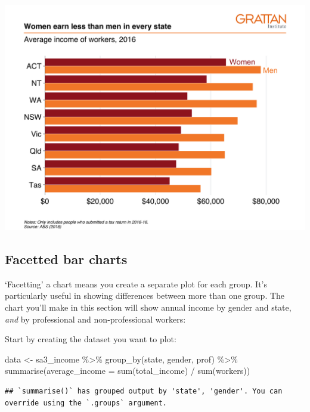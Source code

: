 \documentclass[
]{book}
\newenvironment{Shaded}{\begin{snugshade}}{\end{snugshade}}
\newcommand{\AttributeTok}[1]{\textcolor[rgb]{0.77,0.63,0.00}{#1}}
\newcommand{\FunctionTok}[1]{\textcolor[rgb]{0.00,0.00,0.00}{#1}}
\newcommand{\NormalTok}[1]{#1}
\newcommand{\OtherTok}[1]{\textcolor[rgb]{0.56,0.35,0.01}{#1}}
\newcommand{\SpecialCharTok}[1]{\textcolor[rgb]{0.00,0.00,0.00}{#1}}
\begin{document}
\includegraphics{atlas/multiple_bar.png}

\hypertarget{facet-bar}{%
\subsection{Facetted bar charts}\label{facet-bar}}

`Facetting' a chart means you create a separate plot for each group. It's particularly useful in showing differences between more than one group. The chart you'll make in this section will show annual income by gender and state, \emph{and} by professional and non-professional workers:

Start by creating the dataset you want to plot:

\begin{Shaded}
\begin{Highlighting}[]
\NormalTok{data }\OtherTok{\textless{}{-}}\NormalTok{ sa3\_income }\SpecialCharTok{\%\textgreater{}\%} 
  \FunctionTok{group\_by}\NormalTok{(state, gender, prof) }\SpecialCharTok{\%\textgreater{}\%} 
  \FunctionTok{summarise}\NormalTok{(}\AttributeTok{average\_income =} \FunctionTok{sum}\NormalTok{(total\_income) }\SpecialCharTok{/} \FunctionTok{sum}\NormalTok{(workers))}
\end{Highlighting}
\end{Shaded}

\begin{verbatim}
## `summarise()` has grouped output by 'state', 'gender'. You can override using the `.groups` argument.
\end{verbatim}
\end{document}
